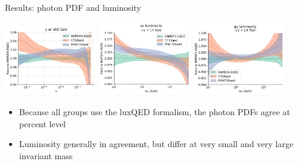 \documentclass[aspectratio=169, 8pt,t]{beamer}
\begin{document}
\begin{frame}{Results: photon PDF and luminosity}
  \begin{center}
    \includegraphics[width=0.3\textwidth]{figures/photon_comparison.pdf}
    \includegraphics[width=0.3\textwidth]{figures/pp_lumi_comparison.png}
    \includegraphics[width=0.3\textwidth]{figures/gp_lumi_comparison.pdf}
  \end{center}
  \begin{itemize}
    \item Because all groups use the luxQED formalism, the photon PDFs agree at percent level
    \item Luminosity generally in agreement, but differ at very small and very large invariant mass
  \end{itemize}
\end{frame}
\end{document}
